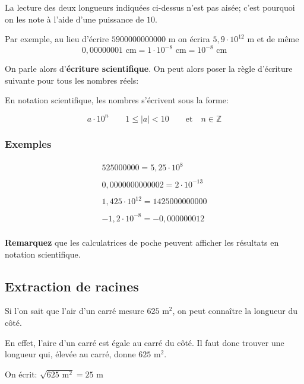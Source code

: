 \documentclass[
  12pt,
]{book}
\begin{document}
La lecture des deux longueurs indiquées ci-dessus n'est pas aisée; c'est pourquoi on les note à l'aide d'une puissance de \(10\).

Par exemple, au lieu d'écrire \(5 900 000 000 000\text{ m}\) on écrira \(5{,}9\cdot 10^{12}\text{ m}\) et de même
\[0{,}000 000 01\text{ cm} = 1\cdot 10^{-8}\text{ cm} = 10^{-8}\text{ cm}\]

On parle alors d'\textbf{écriture scientifique}. On peut alors poser la règle d'écriture suivante pour tous les nombres réels:

\begin{reglebox}
En notation scientifique, les nombres s'écrivent sous la forme:

\[a\cdot 10^n\qquad 1\leq |a| < 10\qquad \text{et}\quad n\in \mathbb{Z}\]

\end{reglebox}

\hypertarget{exemples-5}{%
\subsubsection{Exemples}\label{exemples-5}}

\begin{align*}
 525 000 000 = 5{,}25\cdot 10^8\\
 \\
 0{,}000 000 000 000 2=2\cdot 10^{-13}\\
 \\
 1{,}425\cdot 10^{12}= 1 425 000 000 000\\
 \\
 -1{,}2\cdot 10^{-8}=-0{,}000 000 012\\
\end{align*}

\textbf{Remarquez} que les calculatrices de poche peuvent afficher les résultats en notation scientifique.

\hypertarget{extraction-de-racines}{%
\subsection{Extraction de racines}\label{extraction-de-racines}}

Si l'on sait que l'air d'un carré mesure \(625\text{ m}^2\), on peut connaître la longueur du côté.

En effet, l'aire d'un carré est égale au carré du côté. Il faut donc trouver une longueur qui, élevée au carré, donne \(625\text{ m}^2\).

On écrit: \(\sqrt{625\text{ m}^2}=25\text{ m}\)
\end{document}
